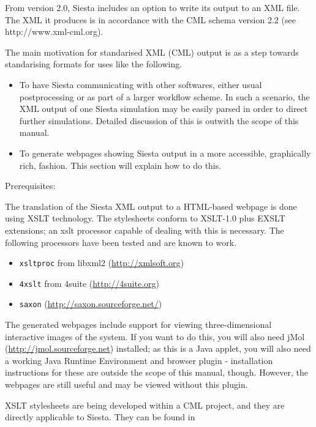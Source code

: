 \documentclass[11pt]{article}
\begin{document}
From version 2.0, {\sc Siesta} includes an option to write its output to an 
XML file. The XML it produces is in accordance with the CML schema version 
2.2 (see http://www.xml-cml.org).

The main motivation for standarised XML (CML) output is as a step
towards standarising formats for uses like the following.

\begin{itemize}

\item To have {\sc Siesta} communicating with other softwares, either
usual postprocessing or as part of a larger workflow scheme. In such a
scenario, the XML output of one {\sc Siesta} simulation may be easily parsed
in order to direct further simulations. Detailed discussion of this is
outwith the scope of this manual.

\item To generate webpages showing {\sc Siesta} output in a more accessible,
graphically rich, fashion. This section will explain how to do this.

\end{itemize}

Prerequisites:

The translation of the {\sc Siesta} XML output to a HTML-based webpage is
done using XSLT technology. The stylesheets conform to XSLT-1.0 plus
EXSLT extensions; an xslt processor capable of dealing with this is
necessary. The following processors have been tested and are known to
work.

\begin{itemize}
  \item \texttt{xsltproc} from libxml2 (\url{http://xmlsoft.org})
  \item \texttt{4xslt} from 4suite (\url{http://4suite.org})
  \item \texttt{saxon} (\url{http://saxon.sourceforge.net/})
\end{itemize}

The generated webpages include support for viewing three-dimensional
interactive images of the system. If you want to do this, you will
also need jMol (\url{http://jmol.sourceforge.net}) installed; as this
is a Java applet, you will also need a working Java Runtime
Environment and browser plugin - installation instructions for these
are outside the scope of this manual, though. However, the webpages
are still useful and may be viewed without this plugin.

XSLT stylesheets are being developed within a CML project, and they
are directly applicable to {\sc Siesta}. They can be found in
\end{document}
